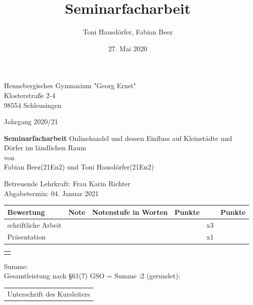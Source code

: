\documentclass[a4paper, 12pt]{scrartcl}
\title{Seminarfacharbeit}
\author{Toni Hausdörfer, Fabian Beez}
\date{27. Mai 2020}
\begin{document}
\begin{titlepage}
    
    \raggedright 
        Hennebergisches Gymnasium "Georg Ernst"\\
        Klosterstraße 2-4\\
        98554 Schleusingen
        
    \raggedleft\vspace*{-1.9cm}
        Jahrgang 2020/21
            \vfill\vfill\vfill\vfill\vfill\vfill

    \centering
        \LARGE\textbf{Seminarfacharbeit} %
            \vfill
        \large Onlinehandel und dessen Einfluss auf Kleinstädte und Dörfer im ländlichen Raum\\[\baselineskip]
        von\\
        Fabian Beez(21En2) und Toni Hausdörfer(21En2)
            \vfill\vfill\vfill\vfill

    \raggedright
        Betreuende Lehrkraft: \hfill Frau Karin Richter\\
        Abgabetermin: \hfill 04. Januar 2021\\[\baselineskip]
        \begin{tabular}[h]{|l|l|l|l|l|l|}
            \hline
            Bewertung & Note & Notenstufe in Worten & Punkte &  & Punkte \\
            \hline
            schriftliche Arbeit & & & & x3 & \\
            \hline
            Präsentation & & & & x1 & \\
            \hline
        \end{tabular}

    \raggedleft\vspace*{-0.05cm}
        \begin{tabular}[h]{|p{1.56cm}|}
            \hline
            \\
            \hline
            \\
            \hline
        \end{tabular}

    \raggedright\vspace*{-1.4cm}
        \hspace*{0.2cm}Summe: \hfill\\
        \hspace*{0.2cm}Gesamtleistung nach §61(7) GSO = Summe :2 (gerundet): \hfill\\[\baselineskip]
            \vfill\vfill\vfill
        
    \raggedleft
        \begin{tabular}{@{}l@{}}\hline
            Unterschrift des Kursleiters
        \end{tabular}
            \vfill\vfill
\end{titlepage}
\end{document}
